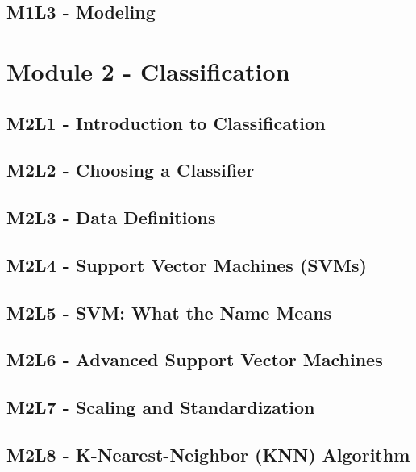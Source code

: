 \documentclass[
]{book}
\begin{document}
\section{M1L3 - Modeling}\label{m1l3---modeling}

\chapter{Module 2 - Classification}\label{module-2---classification}

\section{M2L1 - Introduction to Classification}\label{m2l1---introduction-to-classification}

\section{M2L2 - Choosing a Classifier}\label{m2l2---choosing-a-classifier}

\section{M2L3 - Data Definitions}\label{m2l3---data-definitions}

\section{M2L4 - Support Vector Machines (SVMs)}\label{m2l4---support-vector-machines-svms}

\section{M2L5 - SVM: What the Name Means}\label{m2l5---svm-what-the-name-means}

\section{M2L6 - Advanced Support Vector Machines}\label{m2l6---advanced-support-vector-machines}

\section{M2L7 - Scaling and Standardization}\label{m2l7---scaling-and-standardization}

\section{M2L8 - K-Nearest-Neighbor (KNN) Algorithm}\label{m2l8---k-nearest-neighbor-knn-algorithm}
\end{document}

